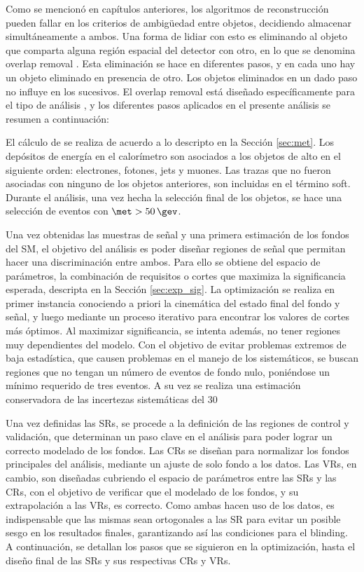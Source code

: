 Como se mencionó en capítulos anteriores, los algoritmos de reconstrucción pueden fallar en los criterios de ambigüedad entre objetos, decidiendo almacenar simultáneamente a ambos. Una forma de lidiar con esto es eliminando al objeto que comparta alguna región espacial del detector con otro, en lo que se denomina overlap removal \cite{Adams:1743654}. Esta eliminación se hace en diferentes pasos, y en cada uno hay un objeto eliminado en presencia de otro. Los objetos eliminados en un dado paso no influye en los sucesivos.
El overlap removal está diseñado específicamente para el tipo de análisis \cite{ATL-COM-PHYS-2016-1518}, y los diferentes pasos aplicados en el presente análisis se resumen a continuación: 




El cálculo de \met se realiza de acuerdo a lo descripto en la Sección \ref{sec:met}. Los depósitos de energía en el calorímetro son asociados a los objetos de alto \pt en el siguiente orden: electrones, fotones, jets y muones. Las trazas que no fueron asociadas con ninguno de los objetos anteriores, son incluidas en el término soft. Durante el análisis, una vez hecha la selección final de los objetos, se hace una selección de eventos con $\met>50\,\gev$.



Una vez obtenidas las muestras de señal y una primera estimación de los fondos del SM, el objetivo del análisis es poder diseñar regiones de señal que permitan hacer una discriminación entre ambos. Para ello se obtiene del espacio de parámetros, la combinación de requisitos o cortes que maximiza la significancia esperada, descripta en la Sección \ref{sec:exp_sig}.
La optimización se realiza en primer instancia conociendo a priori la cinemática del estado final del fondo y señal, y luego mediante un proceso iterativo para encontrar los valores de cortes más óptimos. Al maximizar significancia, se intenta además, no tener regiones muy dependientes del modelo. Con el objetivo de evitar problemas extremos de baja estadística, que causen problemas en el manejo de los sistemáticos, se buscan regiones que no tengan un número de eventos de fondo nulo, poniéndose un mínimo requerido de tres eventos. A su vez se realiza una estimación conservadora de las incertezas sistemáticas del 30

Una vez definidas las SRs, se procede a la definición de las regiones de control y validación, que determinan un paso clave en el análisis para poder lograr un correcto modelado de los fondos. Las CRs se diseñan para normalizar los fondos principales del análisis, mediante un ajuste de solo fondo a los datos. Las VRs, en cambio, son diseñadas cubriendo el espacio de parámetros entre las SRs y las CRs, con el objetivo de verificar que el modelado de los fondos, y su extrapolación a las VRs, es correcto. Como ambas hacen uso de los datos, es indispensable que las mismas sean ortogonales a las SR para evitar un posible sesgo en los resultados finales, garantizando así las condiciones para el blinding.
A continuación, se detallan los pasos que se siguieron en la optimización, hasta el diseño final de las SRs y sus respectivas CRs y VRs.



